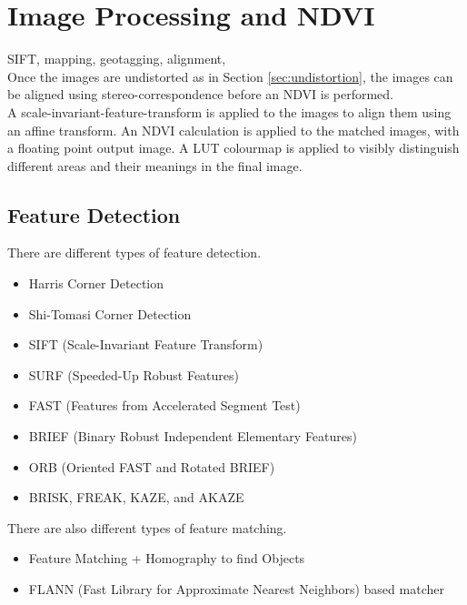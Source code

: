\chapter{Image Processing and NDVI}
\label{sec:image_processing}
SIFT, mapping, geotagging, alignment,\\

Once the images are undistorted as in Section \ref{sec:undistortion}, the images can be aligned using stereo-correspondence before an NDVI is performed.\\

A scale-invariant-feature-transform is applied to the images to align them using an affine transform. An NDVI calculation is applied to the matched images, with a floating point output image. A LUT colourmap is applied to visibly distinguish different areas and their meanings in the final image.

\section{Feature Detection}

There are different types of feature detection. 
\begin{itemize}
	\item Harris Corner Detection
	\item Shi-Tomasi Corner Detection
	\item SIFT (Scale-Invariant Feature Transform)
	\item SURF (Speeded-Up Robust Features)
	\item FAST (Features from Accelerated Segment Test)
	\item BRIEF (Binary Robust Independent Elementary Features)
	\item ORB (Oriented FAST and Rotated BRIEF)
	\item BRISK, FREAK, KAZE, and AKAZE
\end{itemize}

There are also different types of feature matching.

\begin{itemize}
	\item Feature Matching + Homography to find Objects
	\item FLANN (Fast Library for Approximate Nearest Neighbors) based matcher
\end{itemize}

